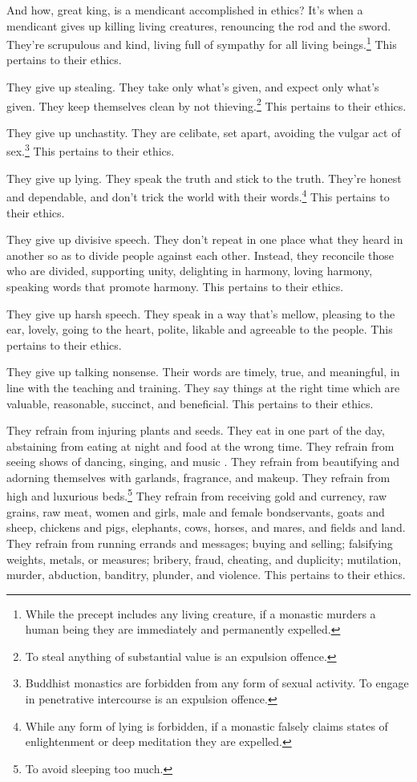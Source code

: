 \documentclass[12pt,openany]{book}%
\begin{document}
And how, great king, is a mendicant accomplished in ethics? It’s when a mendicant gives up killing living creatures, renouncing the rod and the sword. They’re scrupulous and kind, living full of sympathy for all living beings.\footnote{While the precept includes any living creature, if a monastic murders a human being they are immediately and permanently expelled. } This pertains to their ethics. 

They give up stealing. They take only what’s given, and expect only what’s given. They keep themselves clean by not thieving.\footnote{To steal anything of substantial value is an expulsion offence. } This pertains to their ethics. 

They give up unchastity. They are celibate, set apart, avoiding the vulgar act of sex.\footnote{Buddhist monastics are forbidden from any form of sexual activity. To engage in penetrative intercourse is an expulsion offence. } This pertains to their ethics. 

They give up lying. They speak the truth and stick to the truth. They’re honest and dependable, and don’t trick the world with their words.\footnote{While any form of lying is forbidden, if a monastic falsely claims states of enlightenment or deep meditation they are expelled. } This pertains to their ethics. 

They give up divisive speech. They don’t repeat in one place what they heard in another so as to divide people against each other. Instead, they reconcile those who are divided, supporting unity, delighting in harmony, loving harmony, speaking words that promote harmony. This pertains to their ethics. 

They give up harsh speech. They speak in a way that’s mellow, pleasing to the ear, lovely, going to the heart, polite, likable and agreeable to the people. This pertains to their ethics. 

They give up talking nonsense. Their words are timely, true, and meaningful, in line with the teaching and training. They say things at the right time which are valuable, reasonable, succinct, and beneficial. This pertains to their ethics. 

They refrain from injuring plants and seeds. They eat in one part of the day, abstaining from eating at night and food at the wrong time. They refrain from seeing shows of dancing, singing, and music . They refrain from beautifying and adorning themselves with garlands, fragrance, and makeup. They refrain from high and luxurious beds.\footnote{To avoid sleeping too much. } They refrain from receiving gold and currency, raw grains, raw meat, women and girls, male and female bondservants, goats and sheep, chickens and pigs, elephants, cows, horses, and mares, and fields and land. They refrain from running errands and messages; buying and selling; falsifying weights, metals, or measures; bribery, fraud, cheating, and duplicity; mutilation, murder, abduction, banditry, plunder, and violence. This pertains to their ethics. 
\end{document}
